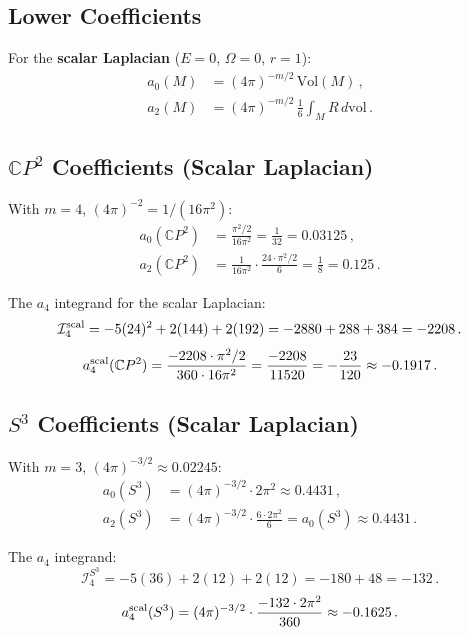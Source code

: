 \documentclass[12pt,a4paper]{article}
\theoremstyle{definition}
\begin{document}
\subsection{Lower Coefficients}

For the \textbf{scalar Laplacian} ($E = 0$, $\Omega = 0$, $r = 1$):
\begin{align}
a_0(M) &= (4\pi)^{-m/2}\,\mathrm{Vol}(M)\,, \\
a_2(M) &= (4\pi)^{-m/2}\,\frac{1}{6}\int_M R\,d\mathrm{vol}\,.
\end{align}

\subsection{$\mathbb{C}P^2$ Coefficients (Scalar Laplacian)}

With $m = 4$, $(4\pi)^{-2} = 1/(16\pi^2)$:
\begin{align}
a_0(\mathbb{C}P^2) &= \frac{\pi^2/2}{16\pi^2} = \frac{1}{32} = 0.03125\,, \\
a_2(\mathbb{C}P^2) &= \frac{1}{16\pi^2}\cdot\frac{24 \cdot \pi^2/2}{6}
= \frac{1}{8} = 0.125\,.
\end{align}

The $a_4$ integrand for the scalar Laplacian:
\begin{equation}
\mathcal{I}_4^{\rm scal} = -5(24)^2 + 2(144) + 2(192)
= -2880 + 288 + 384 = -2208\,.
\end{equation}
\begin{equation}
a_4^{\rm scal}(\mathbb{C}P^2) = \frac{-2208 \cdot \pi^2/2}{360 \cdot 16\pi^2}
= \frac{-2208}{11520} = -\frac{23}{120} \approx -0.1917\,.
\end{equation}

\subsection{$S^3$ Coefficients (Scalar Laplacian)}

With $m = 3$, $(4\pi)^{-3/2} \approx 0.02245$:
\begin{align}
a_0(S^3) &= (4\pi)^{-3/2} \cdot 2\pi^2 \approx 0.4431\,, \\
a_2(S^3) &= (4\pi)^{-3/2} \cdot \frac{6 \cdot 2\pi^2}{6} = a_0(S^3) \approx 0.4431\,.
\end{align}

The $a_4$ integrand:
\begin{equation}
\mathcal{I}_4^{S^3} = -5(36) + 2(12) + 2(12) = -180 + 48 = -132\,.
\end{equation}
\begin{equation}
a_4^{\rm scal}(S^3) = (4\pi)^{-3/2}\cdot\frac{-132 \cdot 2\pi^2}{360}
\approx -0.1625\,.
\end{equation}
\end{document}
